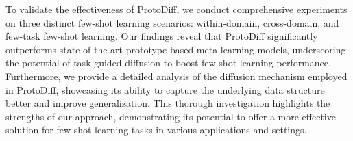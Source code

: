 To validate the effectiveness of ProtoDiff, we conduct comprehensive experiments on three distinct few-shot learning scenarios: within-domain, cross-domain, and few-task few-shot learning. Our findings reveal that ProtoDiff significantly outperforms state-of-the-art prototype-based meta-learning models, underscoring the potential of task-guided diffusion to boost few-shot learning performance.
%
Furthermore, we provide a detailed analysis of the diffusion mechanism employed in ProtoDiff, showcasing its ability to capture the underlying data structure better and improve generalization. This thorough investigation highlights the strengths of our approach, demonstrating its potential to offer a more effective solution for few-shot learning tasks in various applications and settings.